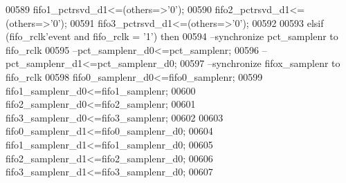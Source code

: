 \begin{DoxyCode}
00589             \textcolor{vhdlchar}{fifo1_pctrsvd_d1}\textcolor{vhdlchar}{<=}\textcolor{vhdlchar}{(}\textcolor{keywordflow}{others}\textcolor{vhdlchar}{=}\textcolor{vhdlchar}{>}\textcolor{vhdlchar}{'}\textcolor{vhdllogic}{}\textcolor{vhdllogic}{0}\textcolor{vhdlchar}{'}\textcolor{vhdlchar}{)};
00590             \textcolor{vhdlchar}{fifo2_pctrsvd_d1}\textcolor{vhdlchar}{<=}\textcolor{vhdlchar}{(}\textcolor{keywordflow}{others}\textcolor{vhdlchar}{=}\textcolor{vhdlchar}{>}\textcolor{vhdlchar}{'}\textcolor{vhdllogic}{}\textcolor{vhdllogic}{0}\textcolor{vhdlchar}{'}\textcolor{vhdlchar}{)};
00591             \textcolor{vhdlchar}{fifo3_pctrsvd_d1}\textcolor{vhdlchar}{<=}\textcolor{vhdlchar}{(}\textcolor{keywordflow}{others}\textcolor{vhdlchar}{=}\textcolor{vhdlchar}{>}\textcolor{vhdlchar}{'}\textcolor{vhdllogic}{}\textcolor{vhdllogic}{0}\textcolor{vhdlchar}{'}\textcolor{vhdlchar}{)};
00592             
00593         \textcolor{keywordflow}{elsif} \textcolor{vhdlchar}{(}\textcolor{vhdlchar}{fifo_rclk}\textcolor{vhdlchar}{'}\textcolor{vhdlkeyword}{event} \textcolor{keywordflow}{and} \textcolor{vhdlchar}{fifo_rclk} \textcolor{vhdlchar}{=} \textcolor{vhdlchar}{'}\textcolor{vhdllogic}{}\textcolor{vhdllogic}{1}\textcolor{vhdlchar}{'}\textcolor{vhdlchar}{)} \textcolor{keywordflow}{then}
00594 \textcolor{keyword}{            --synchronize pct\_samplenr to fifo\_rclk}
00595 \textcolor{keyword}{           --pct\_samplenr\_d0<=pct\_samplenr;}
00596 \textcolor{keyword}{            --pct\_samplenr\_d1<=pct\_samplenr\_d0;}
00597 \textcolor{keyword}{            --synchronize fifox\_samplenr to fifo\_rclk}
00598             \textcolor{vhdlchar}{fifo0_samplenr_d0}\textcolor{vhdlchar}{<=}\textcolor{vhdlchar}{fifo0_samplenr};
00599             \textcolor{vhdlchar}{fifo1_samplenr_d0}\textcolor{vhdlchar}{<=}\textcolor{vhdlchar}{fifo1_samplenr};
00600             \textcolor{vhdlchar}{fifo2_samplenr_d0}\textcolor{vhdlchar}{<=}\textcolor{vhdlchar}{fifo2_samplenr};
00601             \textcolor{vhdlchar}{fifo3_samplenr_d0}\textcolor{vhdlchar}{<=}\textcolor{vhdlchar}{fifo3_samplenr};
00602             
00603             \textcolor{vhdlchar}{fifo0_samplenr_d1}\textcolor{vhdlchar}{<=}\textcolor{vhdlchar}{fifo0_samplenr_d0};
00604             \textcolor{vhdlchar}{fifo1_samplenr_d1}\textcolor{vhdlchar}{<=}\textcolor{vhdlchar}{fifo1_samplenr_d0};
00605             \textcolor{vhdlchar}{fifo2_samplenr_d1}\textcolor{vhdlchar}{<=}\textcolor{vhdlchar}{fifo2_samplenr_d0};
00606             \textcolor{vhdlchar}{fifo3_samplenr_d1}\textcolor{vhdlchar}{<=}\textcolor{vhdlchar}{fifo3_samplenr_d0};
00607             

\end{DoxyCode}
